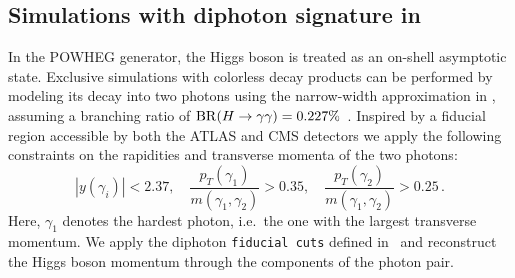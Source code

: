 \documentclass[11pt,a4paper]{article}
\begin{document}
\subsection{Simulations with diphoton signature in \minnlo{}}
In the POWHEG generator, the Higgs boson is treated as an on-shell asymptotic state. Exclusive simulations with colorless decay products can be performed by modeling its decay into two photons using the narrow-width approximation in , assuming a branching ratio of \({\rm BR}(H \to \gamma\gamma) = 0.227\%\)~\cite{LHCHiggsCrossSectionWorkingGroup:2016ypw}.
Inspired by a fiducial region accessible by both the ATLAS and CMS detectors we apply the following constraints on the rapidities and transverse momenta of the two photons:
\begin{equation}
|y(\gamma_i)|< 2.37, \quad
\frac{p_T(\gamma_1)}{m(\gamma_1, \gamma_2)} > 0.35,\quad \frac{p_T(\gamma_2)}{m(\gamma_1, \gamma_2)} > 0.25\,. \label{eq:aafidmycuts}
\end{equation}
Here, \( \gamma_1 \) denotes the hardest photon, i.e.\ the one with the largest transverse momentum. We apply the diphoton \texttt{fiducial cuts} defined in~ and reconstruct the Higgs boson momentum through the components of the photon pair.
\end{document}
